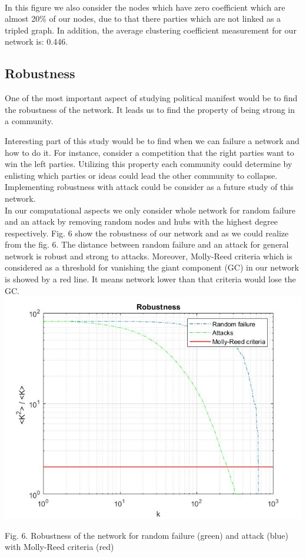 \documentclass{article}%
\begin{document}
~
\\

In this figure we also consider the nodes which have zero coefficient which are almost 20\% of our nodes, due to that there parties which are not linked as a tripled graph. In addition, the average clustering coefficient measurement for our network is: 0.446.


\subsection*{Robustness}

One of the most important aspect of studying political manifest would be to find the robustness of the network. It leads us to find the property of being strong in a community.

Interesting part of this study would be to find when we can failure a network and how to do it. For instance, consider a competition that the right parties want to win the left parties. Utilizing this property each community could determine by enlisting which parties or ideas could lead the other community to collapse. Implementing robustness with attack could be consider as a future study of this network. 
\\

In our computational aspects we only consider whole network for random failure and an attack by removing random nodes and hubs with the highest degree respectively. Fig. 6 show the robustness of our network and as we could realize from the fig. 6. The distance between random failure and an attack for general network is robust and strong to attacks. Moreover, Molly-Reed criteria which is considered as a threshold for vanishing the giant component (GC) in our network is showed by a red line. It means network lower than that criteria would lose the GC.
\\


\includegraphics[scale=0.5]{Robustness}
\begin{center}
\begin{small}
Fig. 6. Robustness of the network for random failure (green) and attack (blue) with Molly-Reed criteria (red)
\end{small}
\end{center}
\end{document}
